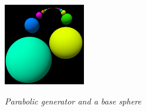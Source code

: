 \begin{figure}[h!tbp]
\begin{minipage}{0.5\hsize}
  \begin{minipage}{0.25\hsize}
   \center
   \includegraphics[width=1.4in, height=1.4in, keepaspectratio]{./img/application/3dGen/parabolicOneOrb.pdf}
   \label{fig:parabolic3dOrb}
  \end{minipage}
  \hspace*{\fill}
  \caption{\textit{Parabolic generator and a base sphere}}
  \label{fig:parabolic3d}
 \end{minipage}
\end{figure}

